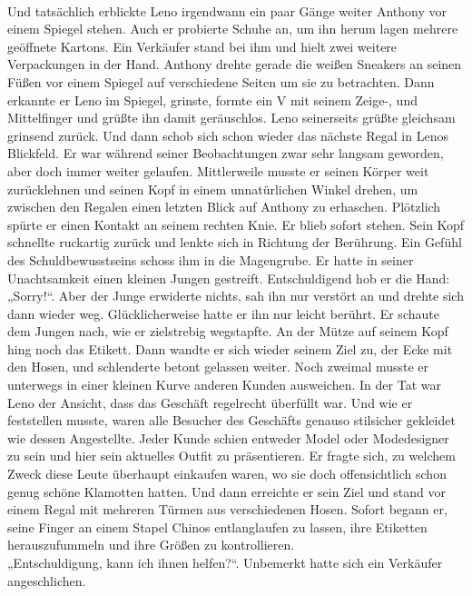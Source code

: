 \documentclass[ngerman,smalldemyvopaper,11pt,oneside,onecolumn,openright,extrafontsizes]{memoir}
\begin{document}
\vspace{0.5em} \\
Und tatsächlich erblickte Leno irgendwann ein paar Gänge weiter Anthony vor einem Spiegel stehen. Auch er probierte Schuhe an, um ihn herum lagen mehrere geöffnete Kartons. Ein Verkäufer stand bei ihm und hielt zwei weitere Verpackungen in der Hand. Anthony drehte gerade die weißen Sneakers an seinen Füßen vor einem Spiegel auf verschiedene Seiten um sie zu betrachten. Dann erkannte er Leno im Spiegel, grinste, formte ein V mit seinem Zeige-, und Mittelfinger und grüßte ihn damit geräuschlos. Leno seinerseits grüßte gleichsam grinsend zurück.
Und dann schob sich schon wieder das nächste Regal in Lenos Blickfeld. Er war während seiner Beobachtungen zwar sehr langsam geworden, aber doch immer weiter gelaufen. Mittlerweile musste er seinen Körper weit zurücklehnen und seinen Kopf in einem unnatürlichen Winkel drehen, um zwischen den Regalen einen letzten Blick auf Anthony zu erhaschen. Plötzlich spürte er einen Kontakt an seinem rechten Knie. Er blieb sofort stehen. Sein Kopf schnellte ruckartig zurück und lenkte sich in Richtung der Berührung. Ein Gefühl des Schuldbewusstseins schoss ihm in die Magengrube. Er hatte in seiner Unachtsamkeit einen kleinen Jungen gestreift. Entschuldigend hob er die Hand:
„Sorry!“.
Aber der Junge erwiderte nichts, sah ihn nur verstört an und drehte sich dann wieder weg. Glücklicherweise hatte er ihn nur leicht berührt. Er schaute dem Jungen nach, wie er zielstrebig wegstapfte. An der Mütze auf seinem Kopf hing noch das Etikett. Dann wandte er sich wieder seinem Ziel zu, der Ecke mit den Hosen, und schlenderte betont gelassen weiter. Noch zweimal musste er unterwegs in einer kleinen Kurve anderen Kunden ausweichen. In der Tat war Leno der Ansicht, dass das Geschäft regelrecht überfüllt war. Und wie er feststellen musste, waren alle Besucher des Geschäfts genauso stilsicher gekleidet wie dessen Angestellte. Jeder Kunde schien entweder Model oder Modedesigner zu sein und hier sein aktuelles Outfit zu präsentieren. Er fragte sich, zu welchem Zweck diese Leute überhaupt einkaufen waren, wo sie doch offensichtlich schon genug schöne Klamotten hatten. Und dann erreichte er sein Ziel und stand vor einem Regal mit mehreren Türmen aus verschiedenen Hosen. Sofort begann er, seine Finger an einem Stapel Chinos entlanglaufen zu lassen, ihre Etiketten herauszufummeln und ihre Größen zu kontrollieren.
\vspace{0.5em} \\
„Entschuldigung, kann ich ihnen helfen?“. Unbemerkt hatte sich ein Verkäufer angeschlichen.
\end{document}
